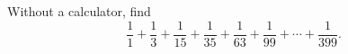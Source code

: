 Without a calculator, find
\[\dfrac11+\dfrac13+\dfrac1{15}+\dfrac1{35}+\dfrac1{63}+\dfrac1{99}+\cdots+\dfrac1{399}.\]
